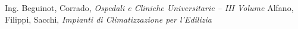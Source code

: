 \begin{thebibliography}{9}
	Ing. Beguinot, Corrado, \emph{Ospedali e Cliniche Universitarie -- III Volume}
	Alfano, Filippi, Sacchi, \emph{Impianti di Climatizzazione per l'Edilizia}
\end{thebibliography}